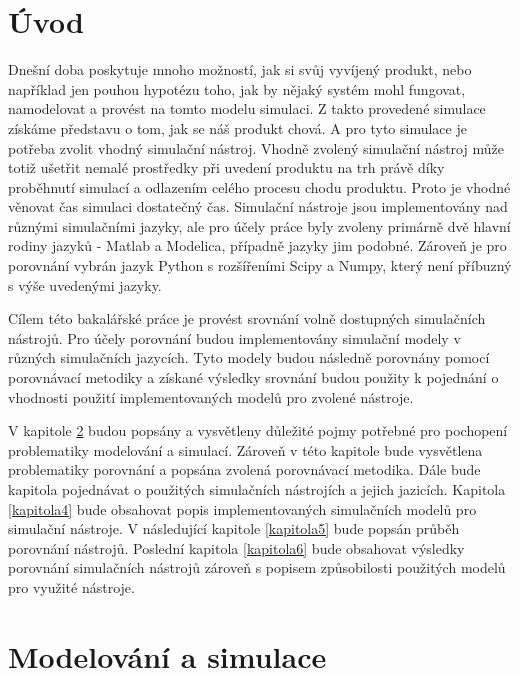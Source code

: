 \chapter{Úvod}

Dnešní doba poskytuje mnoho možností, jak si svůj vyvíjený produkt, nebo například jen pouhou hypotézu toho, jak by nějaký systém mohl fungovat, namodelovat a provést na tomto modelu simulaci. Z takto provedené simulace získáme představu o tom, jak se náš produkt chová. A pro tyto simulace je potřeba zvolit vhodný simulační nástroj. Vhodně zvolený simulační nástroj může totiž ušetřit nemalé prostředky při uvedení produktu na trh právě díky proběhnutí simulací a odlazením celého procesu chodu produktu. Proto je vhodné věnovat čas simulaci dostatečný čas. Simulační nástroje jsou implementovány nad různými simulačními jazyky, ale pro účely práce byly zvoleny primárně dvě hlavní rodiny jazyků - Matlab a Modelica, případně jazyky jim podobné. Zároveň je pro porovnání vybrán jazyk Python s rozšířeními Scipy a Numpy, který není příbuzný s výše uvedenými jazyky.

Cílem této bakalářské práce je provést srovnání volně dostupných simulačních nástrojů. Pro účely porovnání budou implementovány simulační modely v různých simulačních jazycích. Tyto modely budou následně porovnány pomocí porovnávací metodiky a získané výsledky srovnání budou použity k pojednání o vhodnosti použití implementovaných modelů pro zvolené nástroje.

V kapitole \ref{kapitola2} budou popsány a vysvětleny důležité pojmy potřebné pro pochopení problematiky modelování a simulací. Zároveň v této kapitole bude vysvětlena problematiky porovnání a popsána zvolená porovnávací metodika. Dále bude kapitola pojednávat o použitých simulačních nástrojích a jejich jazicích. Kapitola \ref{kapitola4} bude obsahovat popis implementovaných simulačních modelů pro simulační nástroje. V následující kapitole \ref{kapitola5} bude popsán průběh porovnání nástrojů. Poslední kapitola \ref{kapitola6} bude obsahovat výsledky porovnání simulačních nástrojů zároveň s popisem způsobilosti použitých modelů pro využité nástroje.

\chapter{Modelování a simulace}
\label{kapitola2}

